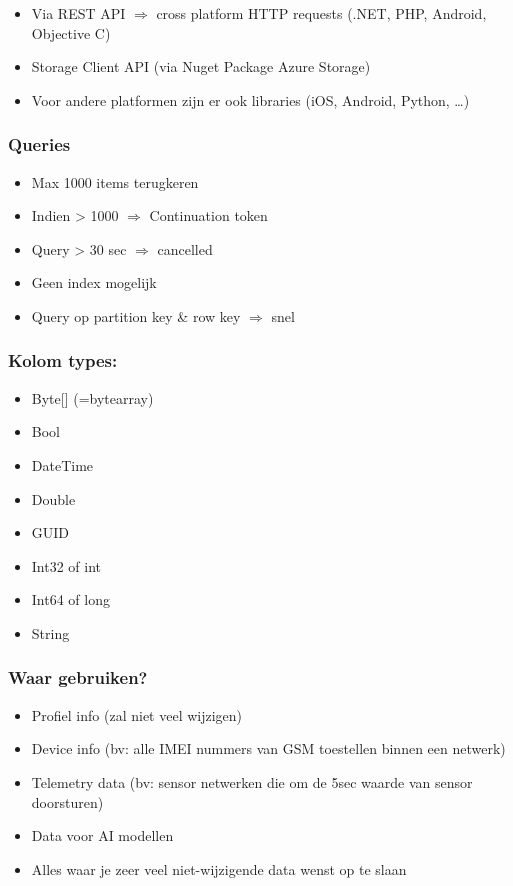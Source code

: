 \documentclass{article}
\begin{document}
\begin{itemize}
    \item Via REST API $\Rightarrow$ cross platform HTTP requests (.NET, PHP, Android, Objective C)
    \item Storage Client API (via Nuget Package Azure Storage)
    \item Voor andere platformen zijn er ook libraries (iOS, Android, Python, \dots)
\end{itemize}

\subsubsection{Queries}

\begin{itemize}
    \item Max 1000 items terugkeren
    \item Indien > 1000 $\Rightarrow$ Continuation token
    \item Query > 30 sec $\Rightarrow$ cancelled
    \item Geen index mogelijk
    \item Query op partition key \& row key $\Rightarrow$ snel
\end{itemize}

\subsubsection{Kolom types: }

\begin{itemize}
    \item Byte[] (=bytearray)
    \item Bool
    \item DateTime
    \item Double
    \item GUID
    \item Int32 of int
    \item Int64 of long
    \item String
\end{itemize}

\subsubsection{Waar gebruiken?}

\begin{itemize}
    \item Profiel info (zal niet veel wijzigen)
    \item Device info (bv: alle IMEI nummers van GSM toestellen binnen een netwerk)
    \item Telemetry data (bv: sensor netwerken die om de 5sec waarde van sensor doorsturen)
    \item Data voor AI modellen
    \item Alles waar je zeer veel niet-wijzigende data wenst op te slaan
\end{itemize}
\end{document}
